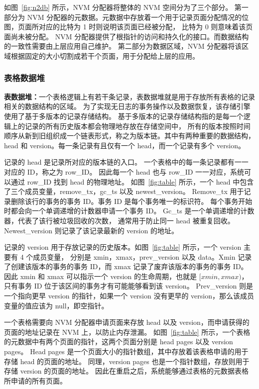 如图~\ref{fig:n2db} 所示，NVM 分配器将整体的 NVM 空间分为了三个部分。
第一部分为 NVM 分配器的元数据。元数据中存放着一个用于记录页面分配情况的位图，页面所对应的比特为 1 时则说明该页面已经被分配，
比特为 0 则意味着该页面尚未被分配。
NVM 分配器提供了根指针的访问和持久化的接口。而数据结构的一致性需要由上层应用自己维护。
第二部分为数据区域，NVM 分配器将该区域根据固定的大小切割成若干个页面，用于分配给上层的应用。

\subsubsection{表格数据堆}

\textbf{表数据堆：}一个表格逻辑上有若干条记录，表数据堆就是用于存放所有表格的记录相关的数据结构的区域。
为了实现无日志的事务操作以及数据恢复，该存储引擎使用了基于多版本的记录存储结构。
基于多版本的记录存储结构指的是每一个逻辑上的记录的所有历史版本都会物理地存放在存储空间中，
所有的版本按照时间顺序从新到旧组织成一个链表形式，称之为版本链。其中有两种重要的数据结构，head 和
version。每一条记录有且仅有一个 head，而一个记录有多个 version。

记录的 head 是记录所对应的版本链的入口。
一个表格中的每一条记录都有一一对应的 ID，称之为 row\_ID。
因此每一个 head 也与 row\_ID 一一对应，系统可以通过 row\_ID 找到 head 的物理地址。
如图~\ref{fig:table} 所示，一个 head 中包含了三个成员变量，remove\_tx，gc\_ts 以及 newest\_version。
Remove\_tx 用于记录删除该行的事务的事务 ID。事务 ID 是每个事务唯一的标识符。
每个事务开始时都会向一个单调递增的计数器申请一个事务 ID。
Gc\_ts 是一个单调递增的计数器，代表了该行被垃圾回收的次数，
通常用于防止同一 head 被重复回收。Newest\_version 则记录了该记录最新的 version 的地址。

记录的 version 用于存放记录的历史版本。如图~\ref{fig:table} 所示，一个 version 主要有 4 个成员变量，
分别是 xmin，xmax，prev\_version 以及 data。Xmin 记录了创建该版本的事务的事务 ID，而 xmax 记录了废弃该版本的事务的事务 ID。
因此 xmin 和 xmax 可以指示一个 version 的生命周期，也就是 $[xmin, xmax)$，只有事务 ID 位于该区间的事务才有可能能够看到该 version。
Prev\_version 则是一个指向更早 version 的指针，如果一个 version 没有更早的 version，那么该成员变量的值应该为 null，即空指针。

一个表格需要向 NVM 分配器申请页面来存放 head 以及 version，而申请获得的页面的地址记录在 NVM 上，以防止内存泄漏。
如图~\ref{fig:table} 所示，一个表格的元数据中有两个页面的指针，这两个页面分别是 head pages 以及 version pages。
Head pages 是一个页面大小的指针数组，其中存放着该表格申请的用于存储 head 的页面的地址。
同理，version pages 也是一个指针数组，存放则用于存储 version 的页面的地址。
因此在重启之后，系统能够通过表格的元数据表格所申请的所有页面。

